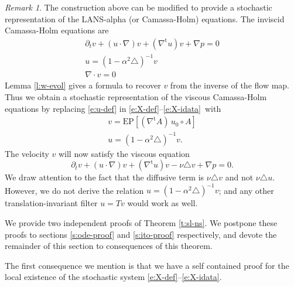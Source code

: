 \documentclass[final]{amsart}%
\newcommand{\snseqns}{\eqref{e:X-def}--\eqref{e:X-idata}}
\newcommand{\del}{\partial}
\newcommand{\lap}{\triangle}
\newcommand{\inv}{^{-1}}
\newcommand{\transpose}{^\text{t}}
\newcommand{\grad}{\nabla}
\newcommand{\gradt}{\grad\transpose}
\newcommand{\divergence}{\grad \cdot}
\newcommand{\E}{\boldsymbol{\mathrm{E}}}
\newcommand{\lhp}{\boldsymbol{\mathrm{P}}}
\newcommand{\Dzero}[2][u]{\del_t #2 + \left(#1 \cdot \grad\right) #2}
\numberwithin{equation}{section}
\theoremstyle{definition}
\theoremstyle{remark}
\newtheorem{rem}[theorem]{Remark}
\begin{document}
\begin{rem}%
The construction above can be modified to provide a stochastic representation of the LANS-alpha (or Camassa-Holm) equations. The inviscid Camassa-Holm \cite{chen, holm} equations are
\begin{gather*}
\Dzero{v} + (\gradt u) v + \grad p = 0\\
u = (1 - \alpha^2\lap)\inv v\\
\divergence v = 0
\end{gather*}
Lemma \ref{l:w-evol} gives a formula to recover $v$ from the inverse of the flow map. Thus we obtain a stochastic representation of the viscous Camassa-Holm equations by replacing \eqref{e:u-def} in \snseqns\ with
\begin{gather}
\label{e:ch-vdef} v = \E\lhp\left[ (\gradt A) \, u_0 \circ A \right]\\
\label{e:ch-udef} u = (1 - \alpha^2 \lap)\inv v.
\end{gather}
The velocity $v$ will now satisfy the viscous equation
\begin{equation*}
\Dzero{v} + (\gradt u) v - \nu \lap v + \grad p = 0.
\end{equation*}
We draw attention to the fact that the diffusive term is $\nu \lap v$ and not $\nu \lap u$. However, we do not derive the relation $u= (1-\alpha^2\lap)\inv v$; and any other translation-invariant filter $u = Tv$ would work as well.
\end{rem}%

We provide two independent proofs of Theorem \ref{t:sl-ns}. We postpone these proofs to sections \ref{s:ode-proof} and \ref{s:ito-proof} respectively, and devote the remainder of this section to consequences of this theorem.

The first consequence we mention is that we have a self contained proof for the local existence of the stochastic system \snseqns.
\end{document}
